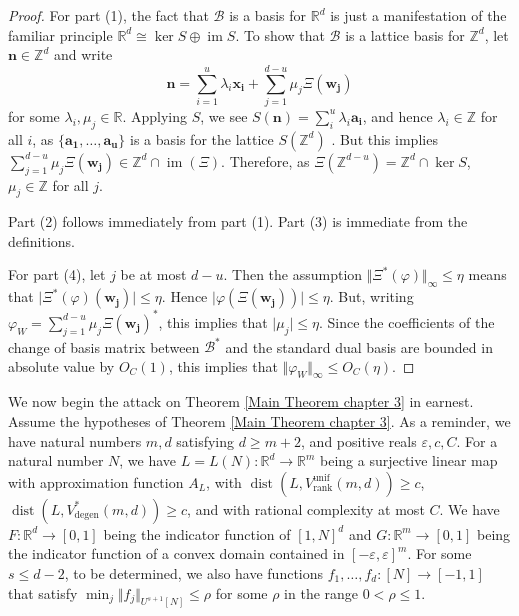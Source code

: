 \documentclass[12pt,a4paper,twoside,reqno]{amsart}
\newcommand{\degen}{\operatorname{degen}}
\newcommand{\rank}{\operatorname{rank}}
\newcommand{\dist}{\operatorname{dist}}
\newcommand{\unif}{\operatorname{unif}}
\newcommand{\im}{\operatorname{im}}
\numberwithin{equation}{section}
\begin{document}
\begin{proof}
For part (1), the fact that $\mathcal{B}$ is a basis for $\mathbb{R}^d$ is just a manifestation of the familiar principle $\mathbb{R}^d \cong \ker S \oplus \im S$. To show that $\mathcal{B}$ is a lattice basis for $\mathbb{Z}^d$, let $\mathbf{n}\in\mathbb{Z}^d$ and write  \[\mathbf{n} = \sum\limits_{i=1}^u \lambda_i \mathbf{x_i} + \sum\limits_{j=1}^{d-u} \mu_j \Xi(\mathbf{w_j})\] for some $\lambda_i,\mu_j\in\mathbb{R}$. Applying $S$, we see $S(\mathbf{n}) = \sum_i^u\lambda_i \mathbf{a_i}$, and hence $\lambda_i\in\mathbb{Z}$ for all $i$, as $\{\mathbf{a_1},\dots,\mathbf{a_u}\}$ is a basis for the lattice $S(\mathbb{Z}^d)$ . But this implies $\sum_{j=1}^{d-u} \mu_j \Xi(\mathbf{w_j}) \in \mathbb{Z}^d \cap \im (\Xi)$. Therefore, as $\Xi(\mathbb{Z}^{d-u}) = \mathbb{Z}^d\cap \ker S$, $\mu_j \in \mathbb{Z}$ for all $j$. 

Part (2) follows immediately from part (1). Part (3) is immediate from the definitions.

For part (4), let $j$ be at most $d-u$. Then the assumption $\Vert \Xi^*(\varphi)\Vert_\infty \leqslant \eta$ means that $\vert \Xi^*(\varphi)(\mathbf{w_j})\vert \leqslant \eta$. Hence $\vert \varphi(\Xi(\mathbf{w_j}))\vert \leqslant \eta$. But, writing $\varphi_W = \sum_{j=1}^{d-u} \mu_j \Xi(\mathbf{w_j})^*$, this implies that $\vert \mu_j\vert \leqslant \eta$. Since the coefficients of the change of basis matrix between $\mathcal{B}^*$ and the standard dual basis are bounded in absolute value by $O_{C}(1)$, this implies that $\Vert \varphi_W\Vert_\infty \leqslant O_C(\eta)$.
\end{proof}

We now begin the attack on Theorem \ref{Main Theorem chapter 3} in earnest. Assume the hypotheses of Theorem \ref{Main Theorem chapter 3}. As a reminder, we have natural numbers $m,d$ satisfying $d\geqslant m+2$, and positive reals $\varepsilon,c,C$. For a natural number $N$, we have $L = L(N):\mathbb{R}^d \longrightarrow \mathbb{R}^m$ being a surjective linear map with approximation function $A_L$, with $\dist(L,V_{\rank}^{\unif}(m,d)) \geqslant c$, $\dist(L,V_{\degen}^*(m,d)) \geqslant c$, and with rational complexity at most $C$. We have $F:\mathbb{R}^d \longrightarrow [0,1]$ being the indicator function of $[1,N]^d$ and $G:\mathbb{R}^m\longrightarrow [0,1]$ being the indicator function of a convex domain contained in $[-\varepsilon,\varepsilon]^m$. For some $s \leqslant d-2$, to be determined, we also have functions $f_1,\dots,f_d:[N]\longrightarrow [-1,1]$ that satisfy $\min_j \Vert f_j\Vert_{U^{s+1}[N]} \leqslant \rho$ for some $\rho$ in the range $0<\rho \leqslant 1$.
\end{document}
